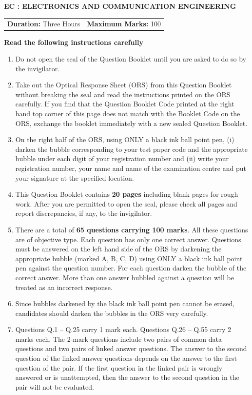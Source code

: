 \documentclass[12pt]{article}
\begin{document}
\begin{center}
    {\LARGE \textbf{EC : ELECTRONICS AND COMMUNICATION ENGINEERING}}\\[0.7em]
    \begin{tabular}{c c}
        \textbf{Duration:} Three Hours & \textbf{Maximum Marks:} 100
    \end{tabular}
\end{center}

\textbf{Read the following instructions carefully}
\begin{enumerate}[leftmargin=2em,itemsep=0.5em]
    \item Do not open the seal of the Question Booklet until you are asked to do so by the invigilator.
    \item Take out the Optical Response Sheet (ORS) from this Question Booklet without breaking the seal and read the instructions printed on the ORS carefully. If you find that the Question Booklet Code printed at the right hand top corner of this page does not match with the Booklet Code on the ORS, exchange the booklet immediately with a new sealed Question Booklet.
    \item On the right half of the ORS, using ONLY a black ink ball point pen, (i) darken the bubble corresponding to your test paper code and the appropriate bubble under each digit of your registration number and (ii) write your registration number, your name and name of the examination centre and put your signature at the specified location.
    \item This Question Booklet contains \textbf{20 pages} including blank pages for rough work. After you are permitted to open the seal, please check all pages and report discrepancies, if any, to the invigilator.
    \item There are a total of \textbf{65 questions carrying 100 marks}. All these questions are of objective type. Each question has only one correct answer. Questions must be answered on the left hand side of the ORS by darkening the appropriate bubble (marked A, B, C, D) using ONLY a black ink ball point pen against the question number. For each question darken the bubble of the correct answer. More than one answer bubbled against a question will be treated as an incorrect response.
    \item Since bubbles darkened by the black ink ball point pen cannot be erased, candidates should darken the bubbles in the ORS very carefully.
    \item Questions Q.1 – Q.25 carry 1 mark each. Questions Q.26 – Q.55 carry 2 marks each. The 2-mark questions include two pairs of common data questions and two pairs of linked answer questions. The answer to the second question of the linked answer questions depends on the answer to the first question of the pair. If the first question in the linked pair is wrongly answered or is unattempted, then the answer to the second question in the pair will not be evaluated.

\end{enumerate}
\end{document}
